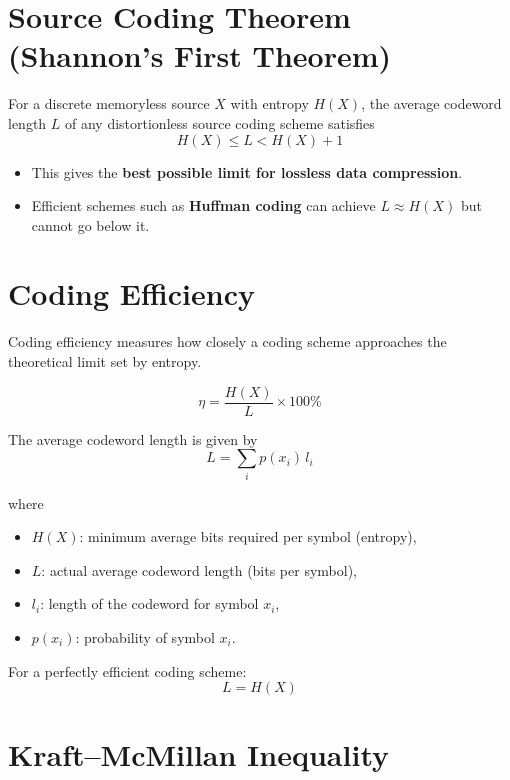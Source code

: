 \documentclass[11pt,a4paper]{book}
\newenvironment{definitionbox}[1][Definition]{
    \begin{tcolorbox}[
        enhanced,
        breakable,
        colback=primaryblue!10,
        colframe=primaryblue!150,
        title=#1,
        fonttitle=\bfseries,
        sharp corners,
        boxrule=0.8pt,
        left=8pt,
        right=8pt,
        top=6pt,
        bottom=6pt
    ]
}{
    \end{tcolorbox}
}
\newenvironment{formulabox}[1][Formula]{
    \begin{tcolorbox}[
        enhanced,
        breakable,
        colback=softcoral!10,
        colframe=softcoral!200,
        title=#1,
        fonttitle=\bfseries,
        coltitle=white,
        sharp corners,
        boxrule=1pt,
        left=8pt,
        right=8pt,
        top=6pt,
        bottom=6pt
    ]
}{
    \end{tcolorbox}
}
\begin{document}
\section{Source Coding Theorem (Shannon's First Theorem)}

\begin{definitionbox}[Source Coding Theorem]
For a discrete memoryless source \(X\) with entropy \(H(X)\),
the average codeword length \(L\) of any distortionless source coding scheme satisfies
\[
H(X) \le L < H(X) + 1
\]

\begin{itemize}
    \item This gives the \textbf{best possible limit for lossless data compression}.
    \item Efficient schemes such as \textbf{Huffman coding} can achieve
    \(L \approx H(X)\) but cannot go below it.
\end{itemize}
\end{definitionbox}

\section{Coding Efficiency}

\begin{formulabox}[Coding Efficiency]
Coding efficiency measures how closely a coding scheme approaches the
theoretical limit set by entropy.

\[
\eta = \frac{H(X)}{L} \times 100\%
\]

The average codeword length is given by
\[
L = \sum_{i} p(x_i)\, l_i
\]

where
\begin{itemize}
    \item \(H(X)\): minimum average bits required per symbol (entropy),
    \item \(L\): actual average codeword length (bits per symbol),
    \item \(l_i\): length of the codeword for symbol \(x_i\),
    \item \(p(x_i)\): probability of symbol \(x_i\).
\end{itemize}

For a perfectly efficient coding scheme:
\[
L = H(X)
\]
\end{formulabox}


\section{Kraft--McMillan Inequality}
\end{document}
